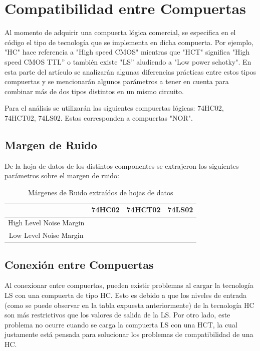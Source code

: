 \section{Compatibilidad entre Compuertas}

Al momento de adquirir una compuerta lógica comercial, se especifica
en el código el tipo de tecnología que se implementa en dicha compuerta.
Por ejemplo, "HC" hace referencia a "High speed CMOS" mientras
que "HCT" significa "High speed CMOS TTL''   o también existe
"LS'' aludiendo a "Low power schotky". En esta parte del artículo
se analizarán algunas diferencias prácticas entre estos tipos compuertas
y se mencionarán algunos parámetros a tener en cuenta para combinar
más de dos tipos distintos en un mismo circuito.

Para el análisis se utilizarán las siguientes compuertas lógicas:
74HC02, 74HCT02, 74LS02. Estas corresponden a compuertas "NOR".

\subsection{Margen de Ruido}

De la hoja de datos de los distintos componentes se extrajeron los
siguientes parámetros sobre el margen de ruido:

\begin{table}[H]
    \centering
\begin{tabular}{|c|c|c|c|}
\hline 
 & 74HC02 & 74HCT02 & 74LS02\tabularnewline
\hline 
High Level Noise Margin &  &  & \tabularnewline
\hline 
Low Level Noise Margin &  &  & \tabularnewline
\hline 
\end{tabular}

\caption{Márgenes de Ruido extraídos de hojas de datos}
\end{table}


\subsection{Conexión entre Compuertas}

Al conexionar entre compuertas, pueden existir problemas al cargar
la tecnología LS con una compuerta de tipo HC. Esto es debido a que
los niveles de entrada (como se puede observar en la tabla expuesta
anteriormente) de la tecnología HC son más restrictivos que los valores
de salida de la LS. Por otro lado, este problema no ocurre cuando
se carga la compuerta LS con una HCT, la cual justamente está pensada
para solucionar los problemas de compatibilidad de una HC.

